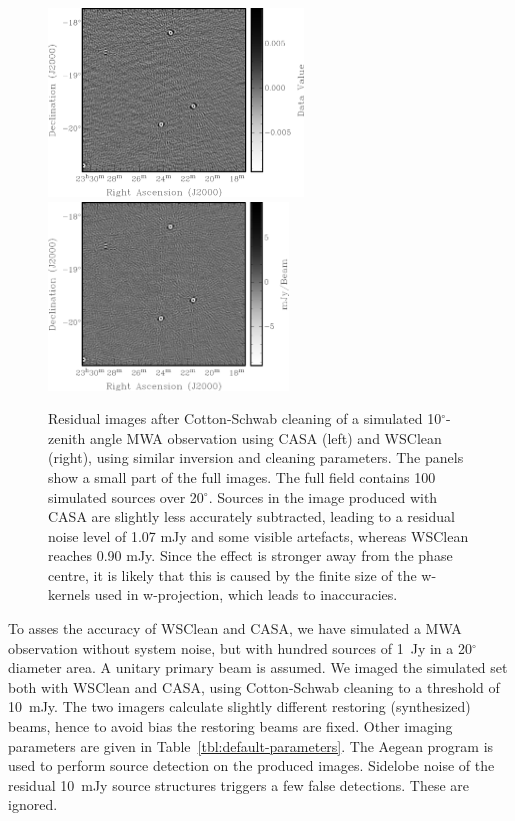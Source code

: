 \documentclass[useAMS,usenatbib]{mn2e}
\newcommand{\degree}{\ensuremath{^{\circ}}\xspace}
\begin{document}
\begin{figure}
\begin{center}
\includegraphics[height=5cm]{img/residual-casa}\hspace{1cm}\includegraphics[height=5cm]{img/residual-wsclean}
\caption{Residual images after Cotton-Schwab cleaning of a simulated 10\degree-zenith angle MWA observation using CASA (left) and WSClean (right), using similar inversion and cleaning parameters. The panels show a small part of the full images. The full field contains 100 simulated sources over 20\degree. Sources in the image produced with CASA are slightly less accurately subtracted, leading to a residual noise level of 1.07 mJy and some visible artefacts, whereas WSClean reaches 0.90 mJy. Since the effect is stronger away from the phase centre, it is likely that this is caused by the finite size of the w-kernels used in w-projection, which leads to inaccuracies.}
\label{fig:residuals}
\end{center}
\end{figure}

To asses the accuracy of WSClean and CASA, we have simulated a MWA observation without system noise, but with hundred sources of 1~Jy in a 20\degree diameter area. A unitary primary beam is assumed. We imaged the simulated set both with WSClean and CASA, using Cotton-Schwab cleaning to a threshold of 10~mJy. The two imagers calculate slightly different restoring (synthesized) beams, hence to avoid bias the restoring beams are fixed. Other imaging parameters are given in Table~\ref{tbl:default-parameters}. The Aegean program \citep{aegean-hancock-2012} is used to perform source detection on the produced images. Sidelobe noise of the residual 10~mJy source structures triggers a few false detections. These are ignored.
\end{document}
